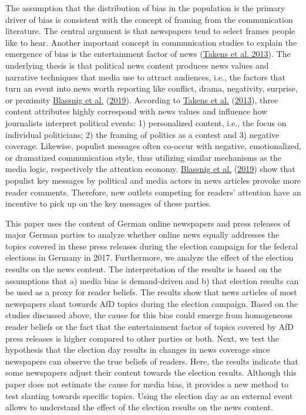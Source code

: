 \documentclass[
  12pt,
]{article}
\begin{document}
The assumption that the distribution of bias in the population is the
primary driver of bias is consistent with the concept of framing from
the communication literature. The central argument is that newspapers
tend to select frames people like to hear. Another important concept in
communication studies to explain the emergence of bias is the
entertainment factor of news
(\protect\hyperlink{ref-takens_media_2013}{Takens et al. 2013}). The
underlying thesis is that political news content produces news values
and narrative techniques that media use to attract audiences, i.e., the
factors that turn an event into news worth reporting like conflict,
drama, negativity, surprise, or proximity
\protect\hyperlink{ref-blassnig_hitting_2019}{Blassnig et al.}
(\protect\hyperlink{ref-blassnig_hitting_2019}{2019}). According to
\protect\hyperlink{ref-takens_media_2013}{Takens et al.}
(\protect\hyperlink{ref-takens_media_2013}{2013}), three content
attributes highly correspond with news values and influence how
journalists interpret political events: 1) personalized content, i.e.,
the focus on individual politicians; 2) the framing of politics as a
contest and 3) negative coverage. Likewise, populist messages often
co-occur with negative, emotionalized, or dramatized communication
style, thus utilizing similar mechanisms as the media logic,
respectively the attention economy.
\protect\hyperlink{ref-blassnig_hitting_2019}{Blassnig et al.}
(\protect\hyperlink{ref-blassnig_hitting_2019}{2019}) show that populist
key messages by political and media actors in news articles provoke more
reader comments. Therefore, new outlets competing for readers' attention
have an incentive to pick up on the key messages of these parties.

This paper uses the content of German online newspapers and press
releases of major German parties to analyze whether online news equally
addresses the topics covered in these press releases during the election
campaign for the federal elections in Germany in 2017. Furthermore, we
analyze the effect of the election results on the news content. The
interpretation of the results is based on the assumptions that a) media
bias is demand-driven and b) that election results can be used as a
proxy for reader beliefs. The results show that news articles of most
newspapers slant towards AfD topics during the election campaign. Based
on the studies discussed above, the cause for this bias could emerge
from homogeneous reader beliefs or the fact that the entertainment
factor of topics covered by AfD press releases is higher compared to
other parties or both. Next, we test the hypothesis that the election
day results in changes in news coverage since newspapers can observe the
true beliefs of readers. Here, the results indicate that some newspapers
adjust their content towards the election results. Although this paper
does not estimate the cause for media bias, it provides a new method to
test slanting towards specific topics. Using the election day as an
external event allows to understand the effect of the election results
on the news content.
\end{document}
